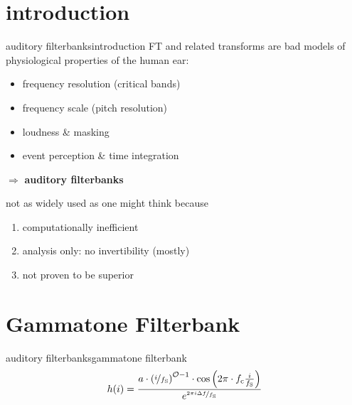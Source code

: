     \section[intro]{introduction}
        \begin{frame}{auditory filterbanks}{introduction}
            FT and related transforms are bad models of physiological properties of the human ear:
                \begin{itemize}
                    \item   frequency resolution (critical bands)
                    \item   frequency scale (pitch resolution)
                    \item   loudness \& masking
                    \item   event perception \&  time integration
                \end{itemize}
            
            \smallskip
            $\Rightarrow$ \textbf{auditory filterbanks}
            
            \pause
            \bigskip
            not as widely used as one might think because
            
            \begin{enumerate}
                \item<3->	computationally inefficient
                \item<3->	analysis only: no invertibility (mostly)
                \item<3->	not proven to be superior
            \end{enumerate}
        \end{frame}	
        
    \section[Gammatone]{Gammatone Filterbank}
        \begin{frame}{auditory filterbanks}{gammatone filterbank}
            \vspace{-6mm}
            \begin{equation*}
                h(i) = \frac{ a \cdot\left(\nicefrac{i}{f_{\mathrm{S}}}\right)^{\mathcal{O}-1}\cdot \cos\left( 2\pi \cdot f_{\mathrm{c}} \frac{ i}{f_{\mathrm{S}}} \right) }{{e}^{\nicefrac{2\pi i \Delta f}{f_{\mathrm{S}}}}}
            \end{equation*}
            \vspace{-4mm}
        \end{frame}	
        
